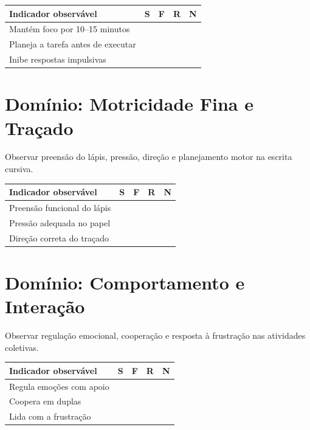 \begin{center}
\renewcommand{\arraystretch}{1.4}
\begin{tabular}{@{}p{9cm}cccc@{}}
\toprule
Indicador observável & S & F & R & N \\
\midrule

Mantém foco por 10–15 minutos & & & & \\

Planeja a tarefa antes de executar & & & & \\

Inibe respostas impulsivas & & & & \\

\bottomrule\end{tabular}\end{center}

\section{Domínio: Motricidade Fina e Traçado}
Observar preensão do lápis, pressão, direção e planejamento motor na escrita cursiva.

\begin{center}
\renewcommand{\arraystretch}{1.4}
\begin{tabular}{@{}p{9cm}cccc@{}}
\toprule
Indicador observável & S & F & R & N \\
\midrule

Preensão funcional do lápis & & & & \\

Pressão adequada no papel & & & & \\

Direção correta do traçado & & & & \\

\bottomrule\end{tabular}\end{center}

\section{Domínio: Comportamento e Interação}
Observar regulação emocional, cooperação e resposta à frustração nas atividades coletivas.

\begin{center}
\renewcommand{\arraystretch}{1.4}
\begin{tabular}{@{}p{9cm}cccc@{}}
\toprule
Indicador observável & S & F & R & N \\
\midrule

Regula emoções com apoio & & & & \\

Coopera em duplas & & & & \\

Lida com a frustração & & & & \\

\bottomrule\end{tabular}\end{center}

